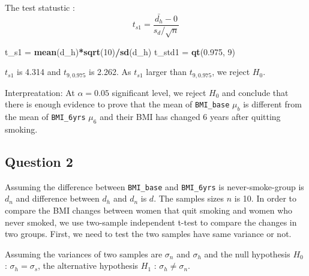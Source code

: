 \documentclass[]{article}
\newenvironment{Shaded}{\begin{snugshade}}{\end{snugshade}}
\newcommand{\KeywordTok}[1]{\textcolor[rgb]{0.13,0.29,0.53}{\textbf{#1}}}
\newcommand{\DecValTok}[1]{\textcolor[rgb]{0.00,0.00,0.81}{#1}}
\newcommand{\FloatTok}[1]{\textcolor[rgb]{0.00,0.00,0.81}{#1}}
\newcommand{\StringTok}[1]{\textcolor[rgb]{0.31,0.60,0.02}{#1}}
\newcommand{\CommentTok}[1]{\textcolor[rgb]{0.56,0.35,0.01}{\textit{#1}}}
\newcommand{\OperatorTok}[1]{\textcolor[rgb]{0.81,0.36,0.00}{\textbf{#1}}}
\newcommand{\NormalTok}[1]{#1}
\begin{document}
\begin{Shaded}
\end{Shaded}

The test statustic : \[t_{s1}= \frac{\bar{d_h}-0}{s_d/\sqrt{n}} \]

\begin{Shaded}
\begin{Highlighting}[]
\NormalTok{t_s1 =}\StringTok{ }\KeywordTok{mean}\NormalTok{(d_h)}\OperatorTok{*}\KeywordTok{sqrt}\NormalTok{(}\DecValTok{10}\NormalTok{)}\OperatorTok{/}\KeywordTok{sd}\NormalTok{(d_h)}
\NormalTok{t_std1 =}\StringTok{ }\KeywordTok{qt}\NormalTok{(}\FloatTok{0.975}\NormalTok{, }\DecValTok{9}\NormalTok{)}
\end{Highlighting}
\end{Shaded}

\(t_{s1}\) is 4.314 and \(t_{9,0.975}\) is 2.262. As \(t_{s1}\) larger
than \(t_{9,0.975}\), we reject \(H_0\).

Interpreatation: At \(\alpha = 0.05\) significant level, we reject
\(H_0\) and conclude that there is enough evidence to prove that the
mean of \texttt{BMI\_base} \(\mu_b\) is different from the mean of
\texttt{BMI\_6yrs} \(\mu_6\) and their BMI has changed 6 years after
quitting smoking.

\subsection{Question 2}\label{question-2-1}

Assuming the difference between \texttt{BMI\_base} and
\texttt{BMI\_6yrs} is never-smoke-group is \(d_n\) and difference
between \(d_h\) and \(d_n\) is \(d\). The samples sizes \(n\) is 10. In
order to compare the BMI changes between women that quit smoking and
women who never smoked, we use two-sample independent t-test to compare
the changes in two groups. First, we need to test the two samples have
same variance or not.

Assuming the variances of two samples are \(\sigma_n\) and \(\sigma_h\)
and the null hypothesis \(H_0\) : \(\sigma_h = \sigma_s\), the
alternative hypothesis \(H_1\) : \(\sigma_h \neq \sigma_n\).
\end{document}
